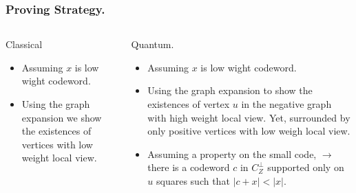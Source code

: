 \documentclass[usenames, aspectratio=169]{beamer}
\theoremstyle{claim}
\theoremstyle{remark}
\begin{document}
\begin{frame}
  \frametitle{ Proving Strategy. }
  \begin{columns}[t]
\begin{column}{0.5\textwidth}

  \begin{block}{Classical}
    \begin{itemize}<+->
      \item Assuming $x$ is low wight codeword. 
      \item Using the graph expansion we show the existences of vertices with low weight local view.  
    \end{itemize}
\end{block}

\end{column}
    \begin{column}{0.5\textwidth}
      \begin{block}{Quantum.}
      \begin{itemize}<+->
        \item Assuming $x$ is low wight codeword. 
        \item  Using the graph expansion to show the existences of vertex $u$ in the negative graph with high weight local view. Yet, surrounded by only positive vertices with low weigh local view. 
        \item Assuming a property on the small code, $\rightarrow$ there is a codeword $c$ in $C_{Z}^{\perp}$ supported only on $u$ squares such that $|c + x| < |x|$. 
      \end{itemize} 
    \end{block}
\end{column}
\end{columns}

\end{frame}

\end{document}
